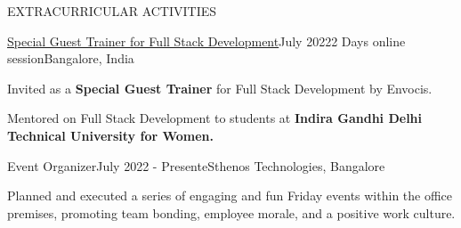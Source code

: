 \documentclass{resume} %
\newcommand{\plainitem}[1]{\item{#1}}
\begin{document}
\begin{rSection}{EXTRACURRICULAR ACTIVITIES}

\begin{rSubsectionNoBullet}{\href{https://www.linkedin.com/posts/envocis_tech-techwave-python-activity-6952676264100917248-eyqK/}{Special Guest Trainer for Full Stack Development}}{July 2022}{2 Days online session}{Bangalore, India}
    \plainitem{Invited as a \textbf{Special Guest Trainer }for Full Stack Development by Envocis.}
    \plainitem{Mentored on Full Stack Development to students at \textbf{Indira Gandhi Delhi Technical University for Women.}}
\end{rSubsectionNoBullet}

\begin{rSubsectionNoBullet}{Event Organizer}{July 2022 - Present}{eSthenos Technologies, Bangalore}
\plainitem{Planned and executed a series of engaging and fun Friday events within the office premises, promoting team bonding, employee morale, and a positive work culture.}
\end{rSubsectionNoBullet}
\end{rSection}
\end{document}

